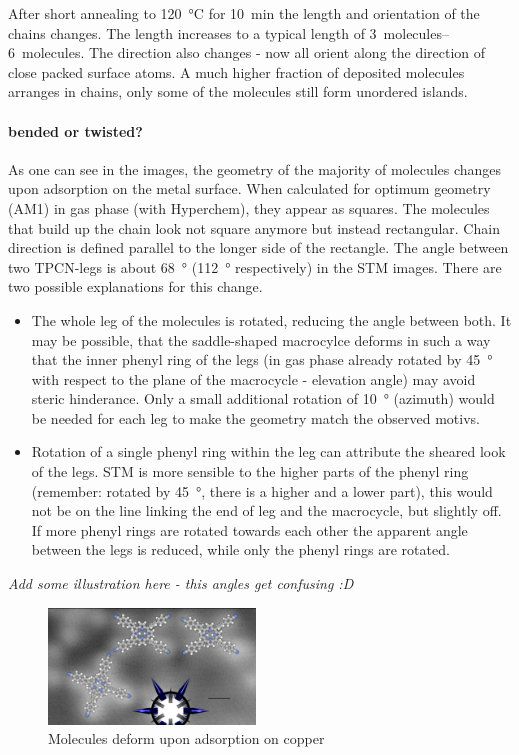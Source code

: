 After short annealing to \SI{120}{\celsius} for \SI{10}{\minute} the length and orientation of the chains changes. The length increases to a typical length of \SIrange{3}{6}{molecules}. The direction also changes - now all orient along the direction of close packed surface atoms.
A much higher fraction of deposited molecules arranges in chains, only some of the molecules still form unordered islands.

\paragraph{bended or twisted?}
As one can see in the images, the geometry of the majority of molecules changes upon adsorption on the metal surface.
When calculated for optimum geometry (AM1) in gas phase (with Hyperchem), they appear as squares. The molecules that build up the chain look not square anymore but instead rectangular. Chain direction is defined parallel to the longer side of the rectangle.
The angle between two TPCN-legs is about \SI{68}{\degree} (\SI{112}{\degree} respectively) in the STM images. There are two possible explanations for this change.
\begin{itemize}
 \item The whole leg of the molecules is rotated, reducing the angle between both. It may be possible, that the saddle-shaped macrocylce deforms in such a way that the inner phenyl ring of the legs (in gas phase already rotated by \SI{45}{\degree} with respect to the plane of the macrocycle - elevation angle) may avoid steric hinderance. Only a small additional rotation of \SI{10}{\degree} (azimuth) would be needed for each leg to make the geometry match the observed motivs.
 \item Rotation of a single phenyl ring within the leg can attribute the sheared look of the legs. STM is more sensible to the higher parts of the phenyl ring (remember: rotated by \SI{45}{\degree}, there is a higher and a lower part), this would not be on the line linking the end of leg and the macrocycle, but slightly off. If more phenyl rings are rotated towards each other the apparent angle between the legs is reduced, while only the phenyl rings are rotated. 
\end{itemize}
\emph{Add some illustration here - this angles get confusing :D}
\begin{figure}
 \centering
 \includegraphics[width=0.49\textwidth]{./images/F150816-162243}
 \caption{Molecules deform upon adsorption on copper}
\end{figure}

